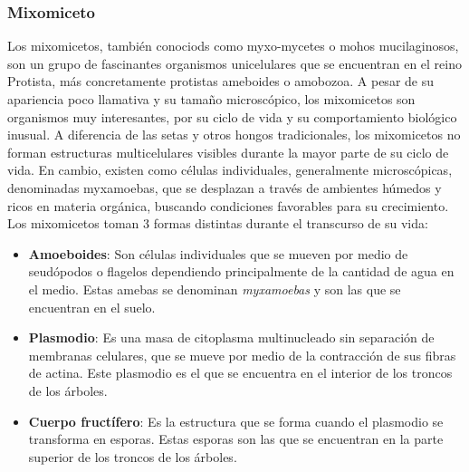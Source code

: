 \subsubsection{Mixomiceto}
    Los mixomicetos, tambi\'en conociods como myxo-mycetes o mohos mucilaginosos, son 
        un grupo de fascinantes organismos unicelulares que se encuentran en el reino Protista, m\'as concretamente
        protistas ameboides o amobozoa.
        A pesar de su apariencia poco llamativa y su tama\~no microsc\'opico,
        los mixomicetos son organismos muy interesantes, por su ciclo de vida y su comportamiento
        biol\'ogico inusual.
    \vskip 0.5cm
    A diferencia de las setas y otros hongos tradicionales, los mixomicetos no forman estructuras 
        multicelulares visibles durante la mayor parte de su ciclo de vida. En cambio, existen como 
        c\'elulas individuales, generalmente microsc\'opicas, denominadas myxamoebas, que se desplazan a
        trav\'es de ambientes h\'umedos y ricos en materia org\'anica, buscando condiciones favorables para su crecimiento.
    \vskip 0.5cm
    Los mixomicetos toman 3 formas distintas durante el transcurso de su vida: 
    \begin{itemize}
        \item \textbf{Amoeboides}: Son c\'elulas individuales que se mueven por medio de 
            seud\'opodos o flagelos dependiendo principalmente de la cantidad de agua en el medio.
            Estas amebas se denominan \textit{myxamoebas} y son las que se encuentran en el suelo.
        \item \textbf{Plasmodio}: Es una masa de citoplasma multinucleado sin separaci\'on de 
            membranas celulares, que se mueve por medio de la contracci\'on de sus fibras de actina.
            Este plasmodio es el que se encuentra en el interior de los troncos de los \'arboles.
        \item \textbf{Cuerpo fruct\'ifero}: Es la estructura que se forma cuando el plasmodio 
            se transforma en esporas. Estas esporas son las que se encuentran en la parte superior 
            de los troncos de los \'arboles.
    \end{itemize}
    \vskip 0.5cm
